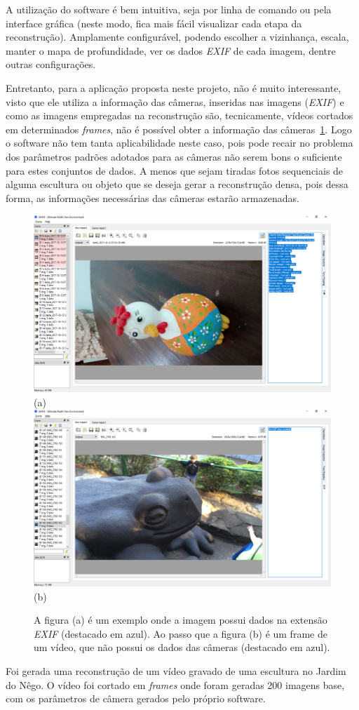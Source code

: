 A utilização do software é bem intuitiva, seja por linha de comando ou pela interface gráfica (neste modo, fica mais fácil visualizar cada etapa da reconstrução). Amplamente configurável, podendo escolher a vizinhança, escala, manter o mapa de profundidade, ver os dados \emph{EXIF} de cada imagem, dentre outras configurações.

Entretanto, para a aplicação proposta neste projeto, não é muito interessante, visto que ele utiliza a informação das câmeras, inseridas nas imagens (\emph{EXIF}) e como as imagens empregadas na reconstrução são, tecnicamente, vídeos cortados em determinados \emph{frames}, não é possível obter a informação das câmeras~\ref{fig:mveexif}. Logo o software não tem tanta aplicabilidade neste caso, pois pode recair no problema dos parâmetros padrões adotados para as câmeras não serem bons o suficiente para estes conjuntos de dados. A menos que sejam tiradas fotos sequenciais de alguma escultura ou objeto que se deseja gerar a reconstrução densa, pois dessa forma, as informações necessárias das câmeras estarão armazenadas.

\begin{figure}[!h]
	\centering
	\includegraphics[width=0.461\linewidth]{figs/exifumve.png}(a)
	\includegraphics[width=0.461\linewidth]{figs/exifsemumve.png}(b)
	\caption{%
	A figura (a) é um exemplo onde a imagem possui dados na extensão \emph{EXIF} (destacado em azul). Ao passo que a figura (b) é um frame de um vídeo, que não possui os dados das câmeras (destacado em azul).
	}\label{fig:mveexif}
\end{figure} 

\newpage

Foi gerada uma reconstrução de um vídeo gravado de uma escultura no Jardim do Nêgo. O  vídeo foi cortado em \emph{frames} onde foram geradas 200 imagens base, com os parâmetros de câmera gerados pelo próprio software. 

